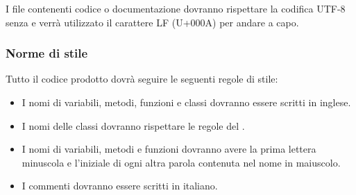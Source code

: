 \label{codifica}
I file contenenti codice o documentazione dovranno rispettare la codifica UTF-8 senza  e verrà utilizzato il carattere LF (U+000A) per andare a capo.

\subsubsection{Norme di stile}
Tutto il codice prodotto dovrà seguire le seguenti regole di stile:
\begin{itemize}
	\item I nomi di variabili, metodi, funzioni e classi dovranno essere scritti in inglese.
	\item I nomi delle classi dovranno rispettare le regole del .
	\item I nomi di variabili, metodi e funzioni dovranno avere la prima lettera minuscola e l'iniziale di ogni altra parola contenuta nel nome in maiuscolo.
	\item I commenti dovranno essere scritti in italiano.
\end{itemize}